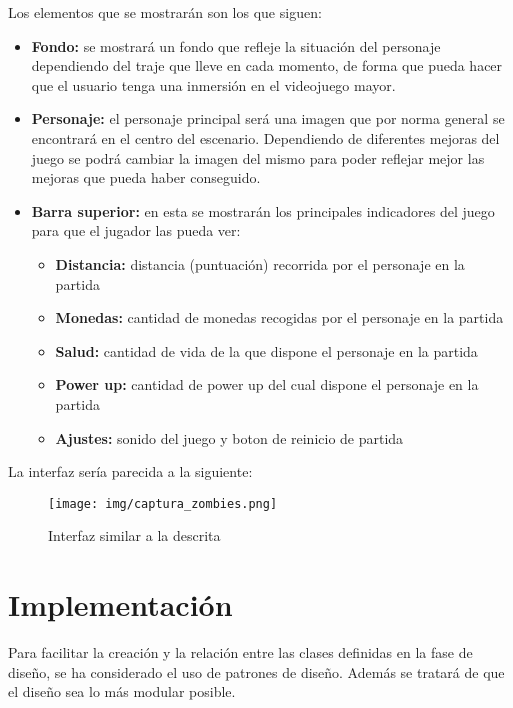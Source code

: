 \documentclass[palatino]{apuntes}
\begin{document}
Los elementos que se mostrarán son los que siguen:
\begin{itemize}
    \item \textbf{Fondo:} se mostrará un fondo que refleje la situación del personaje dependiendo del traje que lleve en cada momento, de forma que pueda hacer que el usuario tenga una inmersión en el videojuego mayor.
    \item \textbf{Personaje:} el personaje principal será una imagen que por norma general se encontrará en el centro del escenario. Dependiendo de diferentes mejoras del juego se podrá cambiar la imagen del mismo para poder reflejar mejor las mejoras que pueda haber conseguido.
    \item \textbf{Barra superior:} en esta se mostrarán los principales indicadores del juego para que el jugador las pueda ver:
        \begin{itemize}
            \item \textbf{Distancia:} distancia (puntuación) recorrida por el personaje en la partida
            \item \textbf{Monedas:} cantidad de monedas recogidas por el personaje en la partida
            \item \textbf{Salud:} cantidad de vida de la que dispone el personaje en la partida
            \item \textbf{Power up:} cantidad de power up del cual dispone el personaje en la partida
            \item \textbf{Ajustes:} sonido del juego y boton de reinicio de partida
            
        \end{itemize}
    
\end{itemize}

La interfaz sería parecida a la siguiente:

\begin{figure}[hbtp]
    \centering
    \texttt{[image: img/captura\_zombies.png]}
    \caption{Interfaz similar a la descrita}
    \label{fig:interfazzombie}
\end{figure}


\chapter{Implementación}
Para facilitar la creación y la relación entre las clases definidas en la fase de diseño, se ha considerado el uso de patrones de diseño. Además se tratará de que el diseño sea lo más modular posible.
\end{document}

